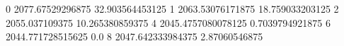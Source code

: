 0 2077.67529296875 32.903564453125
1 2063.53076171875 18.759033203125
2 2055.037109375 10.265380859375
4 2045.4757080078125 0.7039794921875
6 2044.771728515625 0.0
8 2047.642333984375 2.87060546875
